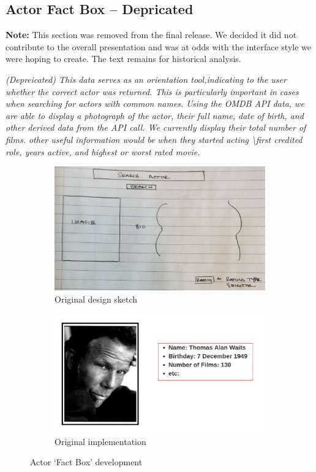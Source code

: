 \documentclass[12pt]{article}
\begin{document}
\subsection{Actor Fact Box -- Depricated}

\textbf{Note:}  This section was removed from the final release. We decided it did not contribute to the overall presentation and was at odds with the interface style we were hoping to create.  The text remains for  historical analysis.


\textit{ (Depreicated)	This data serves as an orientation tool,indicating to the user whether the correct actor was returned.  This is particularly important in cases when searching for actors with common names.  Using the OMDB API data, we are able to display a photograph of the actor, their full name, date of birth, and other derived data from the API call.  We currently display their total number of films.  other useful information would be when they started acting \textbackslash first credited role, years active, and highest or worst rated movie.}
	
		\begin{figure}[h!]
			\centering
			\begin{subfigure}[t]{.5\textwidth}
				  \centering
				  \includegraphics[width=\linewidth]{images/actorFactBox_crop.png}
				  \caption{Original design sketch}
				  \label{fig:sub1}
			\end{subfigure}%
			\begin{subfigure}[t]{.5\textwidth}
				  \centering
				  \includegraphics[width=.8\linewidth]{images/actorBox.png}
				  \caption{Original implementation}
				  \label{fig:sub2}
			\end{subfigure}%
			\caption{Actor `Fact Box' development}
			\label{fig:actorFactBox}
		\end{figure}
\end{document}
